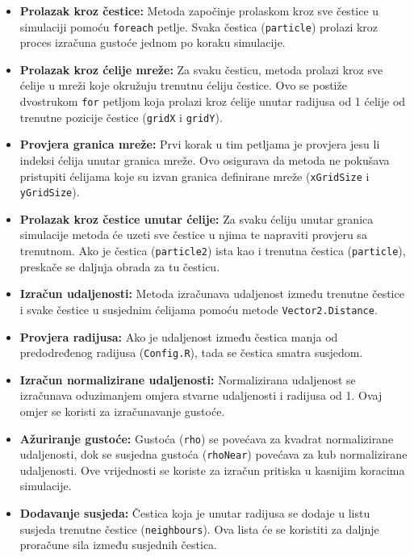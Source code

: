 \documentclass[diplomskirad]{fer}
\begin{document}
    \begin{itemize}
        \item \textbf{Prolazak kroz čestice:} Metoda započinje prolaskom kroz sve čestice u simulaciji pomoću \texttt{foreach} petlje.
        Svaka čestica (\texttt{particle}) prolazi kroz proces izračuna gustoće jednom po koraku simulacije.

        \item \textbf{Prolazak kroz ćelije mreže:} Za svaku česticu, metoda prolazi kroz sve ćelije u mreži koje okružuju trenutnu ćeliju čestice.
        Ovo se postiže dvostrukom \texttt{for} petljom koja prolazi kroz ćelije unutar radijusa od 1 ćelije od trenutne pozicije čestice (\texttt{gridX} i \texttt{gridY}).

        \item \textbf{Provjera granica mreže:} Prvi korak u tim petljama je provjera jesu li indeksi ćelija unutar granica mreže.
        Ovo osigurava da metoda ne pokušava pristupiti ćelijama koje su izvan granica definirane mreže (\texttt{xGridSize} i \texttt{yGridSize}).

        \item \textbf{Prolazak kroz čestice unutar ćelije:} Za svaku ćeliju unutar granica simulacije metoda će uzeti sve čestice u njima te napraviti provjeru sa trenutnom.
        Ako je čestica (\texttt{particle2}) ista kao i trenutna čestica (\texttt{particle}), preskače se daljnja obrada za tu česticu.

        \item \textbf{Izračun udaljenosti:} Metoda izračunava udaljenost između trenutne čestice i svake čestice u susjednim ćelijama pomoću metode \texttt{Vector2.Distance}.

        \item \textbf{Provjera radijusa:} Ako je udaljenost između čestica manja od predodređenog radijusa (\texttt{Config.R}), tada se čestica smatra susjedom.

        \item \textbf{Izračun normalizirane udaljenosti:} Normalizirana udaljenost se izračunava oduzimanjem omjera stvarne udaljenosti i radijusa od 1.
        Ovaj omjer se koristi za izračunavanje gustoće.

        \item \textbf{Ažuriranje gustoće:} Gustoća (\texttt{rho}) se povećava za kvadrat normalizirane udaljenosti, dok se susjedna gustoća (\texttt{rhoNear}) povećava za kub normalizirane udaljenosti.
        Ove vrijednosti se koriste za izračun pritiska u kasnijim koracima simulacije.

        \item \textbf{Dodavanje susjeda:} Čestica koja je unutar radijusa se dodaje u listu susjeda trenutne čestice (\texttt{neighbours}). Ova lista će se koristiti za daljnje proračune sila između susjednih čestica.
    \end{itemize}
\end{document}

